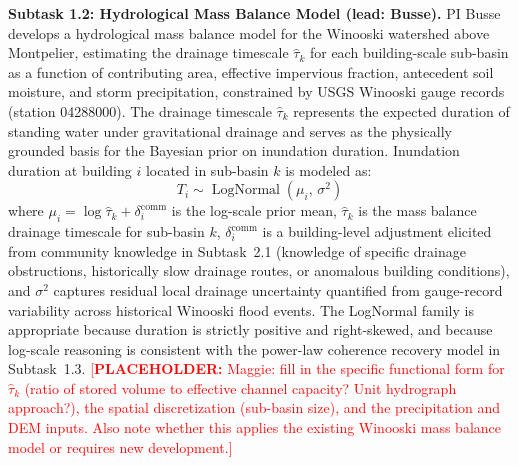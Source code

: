 \documentclass[11pt]{article}
\newcommand{\placeholder}[1]{\textcolor{red}{[\textbf{PLACEHOLDER:} #1]}}
\begin{document}
\textbf{Subtask 1.2: Hydrological Mass Balance Model (lead: Busse).}
PI Busse develops a hydrological mass balance model for the Winooski watershed above Montpelier, estimating the drainage timescale $\hat{\tau}_k$ for each building-scale sub-basin as a function of contributing area, effective impervious fraction, antecedent soil moisture, and storm precipitation, constrained by USGS Winooski gauge records (station 04288000).
The drainage timescale $\hat{\tau}_k$ represents the expected duration of standing water under gravitational drainage and serves as the physically grounded basis for the Bayesian prior on inundation duration.
Inundation duration at building $i$ located in sub-basin $k$ is modeled as:
\begin{equation}
  T_i \sim \operatorname{LogNormal}(\mu_i,\, \sigma^2)
\end{equation}
where $\mu_i = \log \hat{\tau}_k + \delta_i^{\mathrm{comm}}$ is the log-scale prior mean, $\hat{\tau}_k$ is the mass balance drainage timescale for sub-basin $k$, $\delta_i^{\mathrm{comm}}$ is a building-level adjustment elicited from community knowledge in Subtask~2.1 (knowledge of specific drainage obstructions, historically slow drainage routes, or anomalous building conditions), and $\sigma^2$ captures residual local drainage uncertainty quantified from gauge-record variability across historical Winooski flood events.
The LogNormal family is appropriate because duration is strictly positive and right-skewed, and because log-scale reasoning is consistent with the power-law coherence recovery model in Subtask~1.3.
\placeholder{Maggie: fill in the specific functional form for $\hat{\tau}_k$ (ratio of stored volume to effective channel capacity? Unit hydrograph approach?), the spatial discretization (sub-basin size), and the precipitation and DEM inputs. Also note whether this applies the existing Winooski mass balance model or requires new development.}
\end{document}
